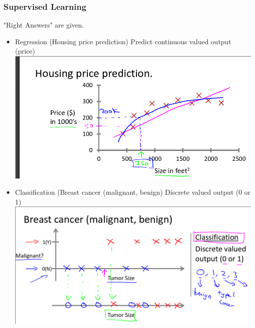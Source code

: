 \documentclass[11pt]{article}
\begin{document}
\subsubsection*{Supervised Learning}
\label{sec-2-2-1}
"Right Answers" are given. 
\begin{itemize}
\item Regression (Housing price prediction)
\label{sec-2-2-1-1}
Predict continuous valued output (price)
\includegraphics[width=.9\linewidth]{./images/screenshot-01.png}
\item Classification (Breast cancer (malignant, benign)
\label{sec-2-2-1-2}
Discrete valued output (0 or 1)
\includegraphics[width=.9\linewidth]{./images/screenshot-02.png}
\end{itemize}
\end{document}
